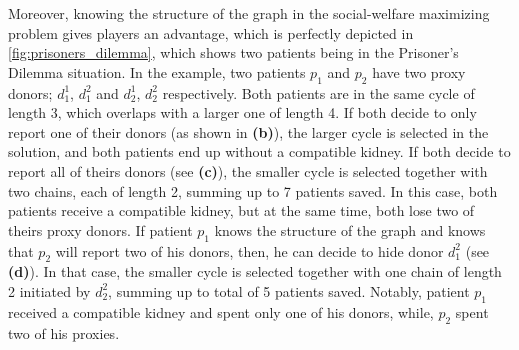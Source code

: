 Moreover, knowing the structure of the graph in the social-welfare maximizing problem gives players an advantage, which is perfectly depicted in \autoref{fig:prisoners_dilemma}, which shows two patients being in the Prisoner's Dilemma situation. In the example, two patients $p_1$ and $p_2$ have two proxy donors; $d_1^1$, $d_1^2$ and $d_2^1$, $d_2^2$ respectively. Both patients are in the same cycle of length 3, which overlaps with a larger one of length 4. If both decide to only report one of their donors (as shown in \textbf{(b)}), the larger cycle is selected in the solution, and both patients end up without a compatible kidney. If both decide to report all of theirs donors (see \textbf{(c)}), the smaller cycle is selected together with two chains, each of length 2, summing up to 7 patients saved. In this case, both patients receive a compatible kidney, but at the same time, both lose two of theirs proxy donors. If patient $p_1$ knows the structure of the graph and knows that $p_2$ will report two of his donors, then, he can decide to hide donor $d_1^2$ (see \textbf{(d)}). In that case, the smaller cycle is selected together with one chain of length 2 initiated by $d_2^2$, summing up to total of 5 patients saved. Notably, patient $p_1$ received a compatible kidney and spent only one of his donors, while, $p_2$ spent two of his proxies.


